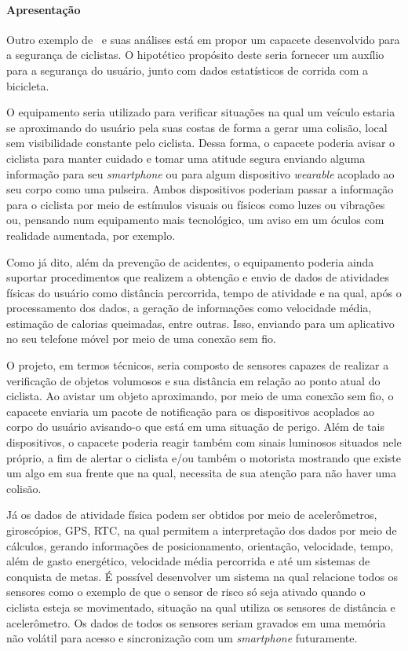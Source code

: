      \paragraph{Apresentação}
         Outro exemplo de \wearable\ e suas análises está em propor um capacete desenvolvido para a segurança de ciclistas.
         O hipotético propósito deste seria fornecer um auxílio para a segurança do usuário, junto com dados estatísticos de corrida com a bicicleta.
         
         O equipamento seria utilizado para verificar situações na qual um veículo estaria se aproximando do usuário pela suas costas de forma a gerar uma colisão, local sem visibilidade constante pelo ciclista.
         Dessa forma, o capacete poderia avisar o ciclista para manter cuidado e tomar uma atitude segura enviando alguma informação para seu \textit{smartphone} ou para algum dispositivo \textit{wearable} acoplado ao seu corpo como uma pulseira.
         Ambos dispositivos poderiam passar a informação para o ciclista por meio de estímulos visuais ou físicos como luzes ou vibrações ou, pensando num equipamento mais tecnológico, um aviso em um óculos com realidade aumentada, por exemplo.
         
         Como já dito, além da prevenção de acidentes, o equipamento poderia ainda suportar procedimentos que realizem a obtenção e envio de dados de atividades físicas do usuário como distância percorrida, tempo de atividade e na qual, após o processamento dos dados, a geração de informações como velocidade média, estimação de calorias queimadas, entre outras.
         Isso, enviando para um aplicativo no seu telefone móvel por meio de uma conexão sem fio.

         O projeto, em termos técnicos, seria composto de sensores capazes de realizar a verificação de objetos volumosos e sua distância em relação ao ponto atual do ciclista.
         Ao avistar um objeto aproximando, por meio de uma conexão sem fio, o capacete enviaria um pacote de notificação para os dispositivos acoplados ao corpo do usuário avisando-o que está em uma situação de perigo.
         Além de tais dispositivos, o capacete poderia reagir também com sinais luminosos situados nele próprio, a fim de alertar o ciclista e/ou também o motorista mostrando que existe um algo em sua frente que na qual, necessita de sua atenção para não haver uma colisão.
         
         Já os dados de atividade física podem ser obtidos por meio de acelerômetros, giroscópios, GPS, RTC, na qual permitem a interpretação dos dados por meio de cálculos, gerando informações de posicionamento, orientação, velocidade, tempo, além de gasto energético, velocidade média percorrida e até um sistemas de conquista de metas.
         É possível desenvolver um sistema na qual relacione todos os sensores como o exemplo de que o sensor de risco só seja ativado quando o ciclista esteja se movimentado, situação na qual utiliza os sensores de distância e acelerômetro.
         Os dados de todos os sensores seriam gravados em uma memória não volátil para acesso e sincronização com um \textit{smartphone} futuramente.
   
